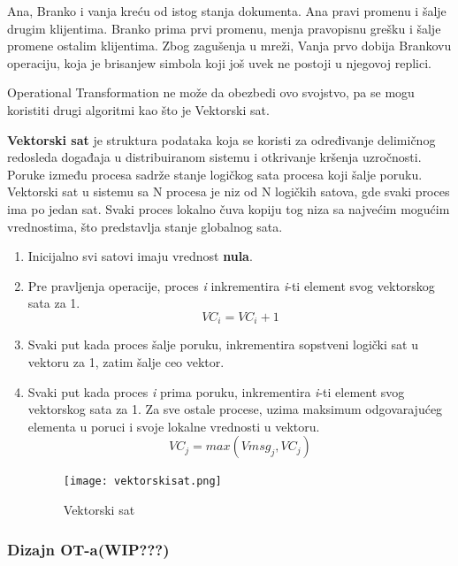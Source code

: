 \documentclass[12pt]{article}
\begin{document}
\begin{itemize}
        Ana, Branko i vanja kreću od istog stanja dokumenta. Ana pravi promenu i šalje drugim klijentima. Branko prima prvi promenu, menja pravopisnu grešku i šalje promene ostalim klijentima. Zbog zagušenja u mreži, Vanja prvo dobija Brankovu operaciju, koja je brisanjew simbola koji još uvek ne postoji u njegovoj replici.

        Operational Transformation ne može da obezbedi ovo svojstvo, pa se mogu koristiti drugi algoritmi kao što je Vektorski sat.

        \textbf{Vektorski sat} je struktura podataka koja se koristi za određivanje delimičnog redosleda događaja u distribuiranom sistemu i otkrivanje kršenja uzročnosti. Poruke između procesa sadrže stanje logičkog sata procesa koji šalje poruku. Vektorski sat u sistemu sa N procesa je niz od N logičkih satova, gde svaki proces ima po jedan sat. Svaki proces lokalno čuva kopiju tog niza sa najvećim mogućim vrednostima, što predstavlja stanje globalnog sata.

        \begin{enumerate}
            \item Inicijalno svi satovi imaju vrednost \textbf{nula}.
            \item Pre pravljenja operacije, proces \textit{i} inkrementira \textit{i}-ti element svog vektorskog sata za 1.
            \[ VC_i = VC_i + 1 \]
            \item Svaki put kada proces šalje poruku, inkrementira sopstveni logički sat u vektoru za 1, zatim šalje ceo vektor.
            \item Svaki put kada proces \textit{i} prima poruku, inkrementira \textit{i}-ti element svog vektorskog sata za 1. Za sve ostale procese, uzima maksimum odgovarajućeg elementa u poruci i svoje lokalne vrednosti u vektoru.
            \[ VC_j = max(Vmsg_j, VC_j)\]
            \begin{figure}[H]
                \centering
                \texttt{[image: vektorskisat.png]}
                \caption{Vektorski sat}
                \label{fig:nls_demo}
            \end{figure}
            
        \end{enumerate}

    \end{itemize}

    \subsubsection{Dizajn OT-a(WIP???)}
\end{document}
